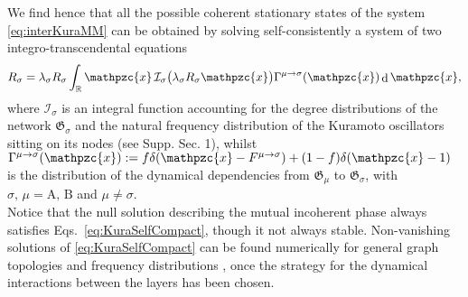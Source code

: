 \documentclass[pre,twocolumn,superscriptaddress]{revtex4}
\DeclareMathOperator{\dd}{\mathrm{d}}
\newcommand{\numberset}{\mathbb}
\newcommand{\R}{\numberset{R}}
\newcommand{\1}{\mathds{1}}
\begin{document}
{We find hence that all the possible coherent stationary states of the system \eqref{eq:interKuraMM} can be obtained by solving self-consistently a system of two integro-transcendental equations
\begin{equation}\label{eq:KuraSelfCompact}
R_\sigma=\lambda_\sigma R_\sigma\int_{\R}\mathpzc{x}\,\mathcal{I}_\sigma\big(\lambda_\sigma R_\sigma  \mathpzc{x}\big)\Gamma^{\mu\to\sigma}(\mathpzc{x})\dd\mathpzc{x},
\end{equation}
\noindent
where $\mathcal{I}_\sigma$ is an integral function accounting for the degree distributions of the network $\mathfrak{G}_\sigma$ and the natural frequency distribution of the Kuramoto oscillators sitting on its nodes (see Supp. Sec. 1), whilst $\Gamma^{\mu\to\sigma}(\mathpzc{x}):=f\delta(\mathpzc{x}-F^{\mu\to\sigma})+(1-f)\delta(\mathpzc{x}-1)$ is the distribution of the dynamical dependencies from $\mathfrak{G}_\mu$ to $\mathfrak{G}_\sigma$, with $\sigma,\,\mu=\mathrm{A},\,\mathrm{B}$ and $\mu\neq\sigma$.\\
\indent
Notice that the null solution describing the mutual incoherent phase always satisfies Eqs.~\eqref{eq:KuraSelfCompact}, though it not always stable.
Non-vanishing solutions of \eqref{eq:KuraSelfCompact} can be found numerically for general graph topologies and frequency distributions \cite{lafuerza2010nonuniversal,omel2012nonuniversal}, once the strategy for the dynamical interactions between the layers has been chosen. 


{
}}
\end{document}
